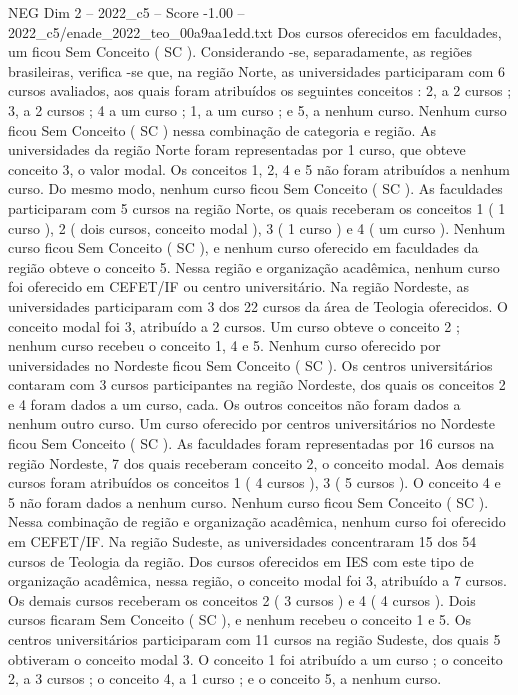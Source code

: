 \begin{textsample}{NEG Dim 2 – 2022\_c5 – Score -1.00 – 2022\_c5/enade\_2022\_teo\_00a9aa1edd.txt}
Dos cursos oferecidos em faculdades, um ficou Sem Conceito ( SC ).
Considerando -se, separadamente, as regiões brasileiras, verifica -se que, na região Norte, as universidades participaram com 6 cursos avaliados, aos quais foram atribuídos os seguintes conceitos : 2, a 2 cursos ; 3, a 2 cursos ; 4 a um curso ; 1, a um curso ; e 5, a nenhum curso.
Nenhum curso ficou Sem Conceito ( SC ) nessa combinação de categoria e região.
As universidades da região Norte foram representadas por 1 curso, que obteve conceito 3, o valor modal.
Os conceitos 1, 2, 4 e 5 não foram atribuídos a nenhum curso.
Do mesmo modo, nenhum curso ficou Sem Conceito ( SC ).
As faculdades participaram com 5 cursos na região Norte, os quais receberam os conceitos 1 ( 1 curso ), 2 ( dois cursos, conceito modal ), 3 ( 1 curso ) e 4 ( um curso ).
Nenhum curso ficou Sem Conceito ( SC ), e nenhum curso oferecido em faculdades da região obteve o conceito 5.
Nessa região e organização acadêmica, nenhum curso foi oferecido em CEFET/IF ou centro universitário.
Na região Nordeste, as universidades participaram com 3 dos 22 cursos da área de Teologia oferecidos.
O conceito modal foi 3, atribuído a 2 cursos.
Um curso obteve o conceito 2 ; nenhum curso recebeu o conceito 1, 4 e 5.
Nenhum curso oferecido por universidades no Nordeste ficou Sem Conceito ( SC ).
Os centros universitários contaram com 3 cursos participantes na região Nordeste, dos quais os conceitos 2 e 4 foram dados a um curso, cada.
Os outros conceitos não foram dados a nenhum outro curso.
Um curso oferecido por centros universitários no Nordeste ficou Sem Conceito ( SC ).
As faculdades foram representadas por 16 cursos na região Nordeste, 7 dos quais receberam conceito 2, o conceito modal.
Aos demais cursos foram atribuídos os conceitos 1 ( 4 cursos ), 3 ( 5 cursos ).
O conceito 4 e 5 não foram dados a nenhum curso.
Nenhum curso ficou Sem Conceito ( SC ).
Nessa combinação de região e organização acadêmica, nenhum curso foi oferecido em CEFET/IF.
Na região Sudeste, as universidades concentraram 15 dos 54 cursos de Teologia da região.
Dos cursos oferecidos em IES com este tipo de organização acadêmica, nessa região, o conceito modal foi 3, atribuído a 7 cursos.
Os demais cursos receberam os conceitos 2 ( 3 cursos ) e 4 ( 4 cursos ).
Dois cursos ficaram Sem Conceito ( SC ), e nenhum recebeu o conceito 1 e 5.
Os centros universitários participaram com 11 cursos na região Sudeste, dos quais 5 obtiveram o conceito modal 3.
O conceito 1 foi atribuído a um curso ; o conceito 2, a 3 cursos ; o conceito 4, a 1 curso ; e o conceito 5, a nenhum curso.

\end{textsample}
